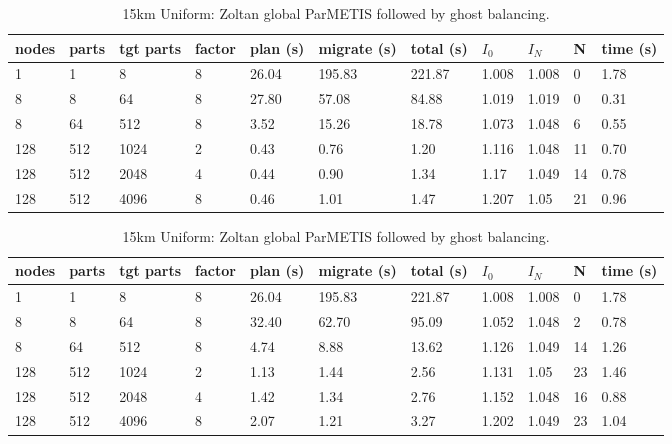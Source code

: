 \documentclass[a4paper]{article}
\begin{document}
\begin{table}
\caption{\label{tab:15kmlg}15km Uniform: Zoltan local ParMETIS followed by ghost balancing.}
\begin{tabular}{  l | l | l | l | l | l | l | l | l | l | l }
    \hline
    nodes & parts & tgt parts & factor & plan (s) & migrate (s) & total (s) & $I_0$ & $I_N$ & N & time (s) \\ \hline
    1 & 1 & 8 & 8 & 26.04 & 195.83 & 221.87 & 1.008 & 1.008 & 0 & 1.78 \\
    8 & 8 & 64 & 8 & 27.80 & 57.08 & 84.88 & 1.019 & 1.019 & 0 & 0.31 \\
    8 & 64 & 512 & 8 & 3.52 & 15.26 & 18.78 & 1.073 & 1.048 & 6 & 0.55 \\
    128 & 512 & 1024 & 2 & 0.43 & 0.76 & 1.20 & 1.116 & 1.048 & 11 & 0.70 \\
    128 & 512 & 2048 & 4 & 0.44 & 0.90 & 1.34 & 1.17 & 1.049 & 14 & 0.78 \\
    128 & 512 & 4096 & 8 & 0.46 & 1.01 & 1.47 & 1.207 & 1.05 & 21 & 0.96 \\
\end{tabular}

\caption{\label{tab:15kmgg}15km Uniform: Zoltan global ParMETIS followed by ghost balancing.}
\begin{tabular}{  l | l | l | l | l | l | l | l | l | l | l }
    \hline
    nodes & parts & tgt parts & factor & plan (s) & migrate (s) & total (s) & $I_0$ & $I_N$ & N & time (s) \\ \hline
      1 & 1 & 8 & 8 & 26.04 & 195.83 & 221.87 & 1.008 & 1.008 & 0 & 1.78 \\
      8 & 8 & 64 & 8 & 32.40 & 62.70 & 95.09 & 1.052 & 1.048 & 2 & 0.78 \\
      8 & 64 & 512 & 8 & 4.74 & 8.88 & 13.62 & 1.126 & 1.049 & 14 & 1.26 \\
      128 & 512 & 1024 & 2 & 1.13 & 1.44 & 2.56 & 1.131 & 1.05 & 23 & 1.46 \\
      128 & 512 & 2048 & 4 & 1.42 & 1.34 & 2.76 & 1.152 & 1.048 & 16 & 0.88 \\
      128 & 512 & 4096 & 8 & 2.07 & 1.21 & 3.27 & 1.202 & 1.049 & 23 & 1.04 \\
\end{tabular}


\end{table}
\end{document}
